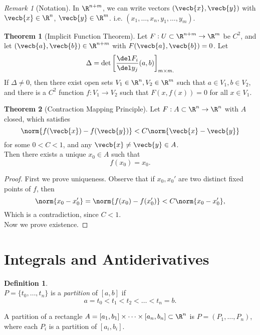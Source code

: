 \documentclass[a5paper]{article}
\theoremstyle{definition}%
\newtheorem{theorem}{Theorem}
\newtheorem*{definition*}{Definition}
\numberwithin{exercise}{section}
\theoremstyle{remark}%
\newtheorem*{remark*}{Remark}
\begin{document}

\begin{remark*}[Notation]
In $\R^{n+m}$, we can write vectors $(\vecb{x}, \vecb{y})$ with $\vecb{x}\in \R^n$, $\vecb{y}\in \R^m$. i.e. $(x_1, \dots, x_n, y_1, \dots, y_m).$ 
\end{remark*}

\begin{highlight}
\begin{theorem}[Implicit Function Theorem]
Let $F:U\subset \R^{n+m}\to \R^m$ be $C^2$, and let $(\vecb{a},\vecb{b})\in \R^{n+m}$ with $F(\vecb{a},\vecb{b})=0$. Let 
$$\Delta=\det\left[\frac{\del F_i}{\del y_j}(a,b)\right]_{m\times m.}$$
If $\Delta\neq0$, then there exist open sets $V_1\in\R^n, V_2\in\R^m$ such that $a\in V_1, b\in V_2$, and there is a $C^2$ function $f:V_1\to V_2$ such that $F(x, f(x))=0$ for all $x\in V_1$. 
\end{theorem}
\end{highlight}

\begin{highlight}
\begin{theorem}[Contraction Mapping Principle]
Let $F:A\subset \R^{n}\to \R^n$ with $A$ closed, which satisfies 
$$\norm{f(\vecb{x})-f(\vecb{y})}< C\norm{\vecb{x}-\vecb{y}}$$
for some $0<C<1$, and any $\vecb{x}\neq\vecb{y}\in A$. \\
Then there exists a unique $x_0\in A$ such that $$f(x_0)=x_0.$$ 
\end{theorem}
\end{highlight}
\begin{proof}
First we prove uniqueness. Observe that if $x_0, x_0'$ are two distinct fixed points of $f$, then 
$$\norm{x_0-x_0'}=\norm{f(x_0)-f(x_0')}<C\norm{x_0-x_0'},$$
Which is a contradiction, since $C<1$. \\
Now we prove existence. 
\end{proof}

\section{Integrals and Antiderivatives}

\begin{highlight}
\begin{definition*}\mbox{}\\
$P=\{t_0, \dots, t_n\}$ is a \emph{partition} of $[a,b]$ if 
$$a=t_0<t_1<t_2<\dots<t_n=b.$$

\noindent A partition of a rectangle $A=[a_1,b_1]\times\dots\times[a_n,b_n]\subset\R^n$ is $P=(P_1, \dots, P_n)$, where each $P_i$ is a partition of $[a_i,b_i]$. 
\end{definition*}
\end{highlight}
\end{document}
